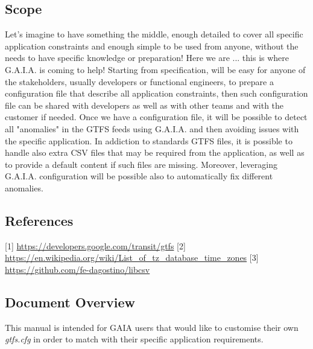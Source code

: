 \documentclass[12pt, a4paper]{book}
\begin{document}
\subsection{Scope}

\begin{justify}
Let's imagine to have something the middle, enough detailed to cover all specific application constraints and enough simple to be used from anyone, without the needs to have specific knowledge or preparation! Here we are ... this is where G.A.I.A. is coming to help!
Starting from specification, will be easy for anyone of the stakeholders, usually developers or functional engineers, to prepare a configuration file that describe all application constraints, then such configuration file can be shared with developers as well as with other teams and with the customer if needed. Once we have a configuration file, it will be possible to detect all "anomalies" in the GTFS feeds using G.A.I.A. and then avoiding issues with the specific application. In addiction to standards GTFS files, it is possible to handle also extra CSV files that may be required from the application, as well as to provide a default content if such files are missing. Moreover, leveraging G.A.I.A. configuration will be possible also to automatically fix different anomalies.
\end{justify}

\subsection{References}
{\small [1] \url{https://developers.google.com/transit/gtfs}}\newline
{\small [2] \url{https://en.wikipedia.org/wiki/List_of_tz_database_time_zones}}\newline
{\small [3] \url{https://github.com/fe-dagostino/libcsv}}


\newpage
\subsection{Document Overview}

\begin{justify}
This manual is intended for GAIA users that would like to customise their own \textit{gtfs.cfg} in order to match with their specific application requirements.
\end{justify}
\end{document}

